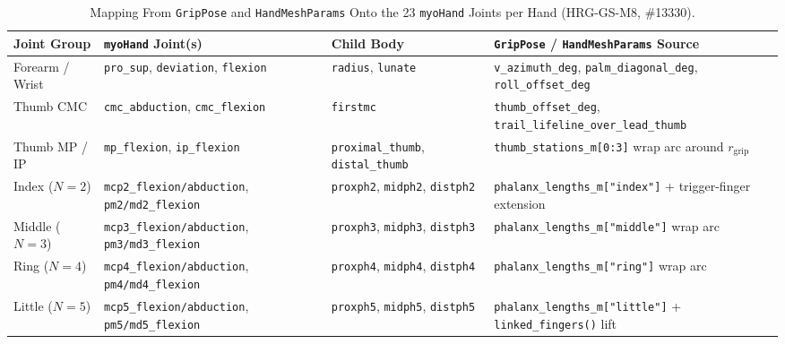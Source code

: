 \documentclass[11pt,a4paper]{article}
\begin{document}
\begin{table}[h!]
\centering
\caption{Mapping From \texttt{GripPose} and \texttt{HandMeshParams} Onto the 23 \texttt{myoHand} Joints per Hand (HRG-GS-M8, \#13330).}
\label{tab:hrg-gs-m8-joints}
\small
\begin{tabular}{llll}
\toprule
Joint Group & \texttt{myoHand} Joint(s) & Child Body & \texttt{GripPose} / \texttt{HandMeshParams} Source \\
\midrule
Forearm / Wrist & \texttt{pro\_sup}, \texttt{deviation}, \texttt{flexion} & \texttt{radius}, \texttt{lunate} & \texttt{v\_azimuth\_deg}, \texttt{palm\_diagonal\_deg}, \texttt{roll\_offset\_deg} \\
Thumb CMC & \texttt{cmc\_abduction}, \texttt{cmc\_flexion} & \texttt{firstmc} & \texttt{thumb\_offset\_deg}, \texttt{trail\_lifeline\_over\_lead\_thumb} \\
Thumb MP / IP & \texttt{mp\_flexion}, \texttt{ip\_flexion} & \texttt{proximal\_thumb}, \texttt{distal\_thumb} & \texttt{thumb\_stations\_m[0:3]} wrap arc around $r_{\mathrm{grip}}$ \\
Index ($N=2$) & \texttt{mcp2\_flexion/abduction}, \texttt{pm2/md2\_flexion} & \texttt{proxph2}, \texttt{midph2}, \texttt{distph2} & \texttt{phalanx\_lengths\_m["index"]} + trigger-finger extension \\
Middle ($N=3$) & \texttt{mcp3\_flexion/abduction}, \texttt{pm3/md3\_flexion} & \texttt{proxph3}, \texttt{midph3}, \texttt{distph3} & \texttt{phalanx\_lengths\_m["middle"]} wrap arc \\
Ring ($N=4$) & \texttt{mcp4\_flexion/abduction}, \texttt{pm4/md4\_flexion} & \texttt{proxph4}, \texttt{midph4}, \texttt{distph4} & \texttt{phalanx\_lengths\_m["ring"]} wrap arc \\
Little ($N=5$) & \texttt{mcp5\_flexion/abduction}, \texttt{pm5/md5\_flexion} & \texttt{proxph5}, \texttt{midph5}, \texttt{distph5} & \texttt{phalanx\_lengths\_m["little"]} + \texttt{linked\_fingers()} lift \\
\bottomrule
\end{tabular}
\end{table}
\end{document}
